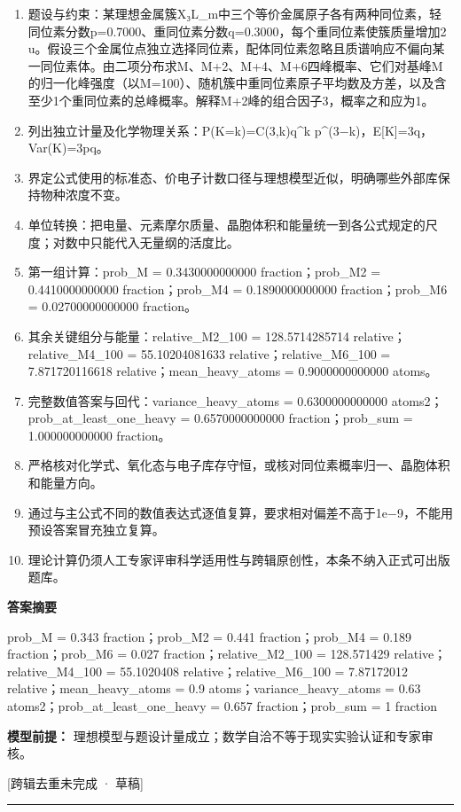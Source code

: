 \documentclass[UTF8,11pt,a4paper]{ctexart}
\begin{document}
\begin{enumerate}
\item 题设与约束：某理想金属簇X₃L\_m中三个等价金属原子各有两种同位素，轻同位素分数p=0.7000、重同位素分数q=0.3000，每个重同位素使簇质量增加2 u。假设三个金属位点独立选择同位素，配体同位素忽略且质谱响应不偏向某一同位素体。由二项分布求M、M+2、M+4、M+6四峰概率、它们对基峰M的归一化峰强度（以M=100）、随机簇中重同位素原子平均数及方差，以及含至少1个重同位素的总峰概率。解释M+2峰的组合因子3，概率之和应为1。
\item 列出独立计量及化学物理关系：P(K=k)=C(3,k)q\textasciicircum{}k p\textasciicircum{}(3−k)，E[K]=3q，Var(K)=3pq。
\item 界定公式使用的标准态、价电子计数口径与理想模型近似，明确哪些外部库保持物种浓度不变。
\item 单位转换：把电量、元素摩尔质量、晶胞体积和能量统一到各公式规定的尺度；对数中只能代入无量纲的活度比。
\item 第一组计算：prob\_M = 0.3430000000000 fraction；prob\_M2 = 0.4410000000000 fraction；prob\_M4 = 0.1890000000000 fraction；prob\_M6 = 0.02700000000000 fraction。
\item 其余关键组分与能量：relative\_M2\_100 = 128.5714285714 relative；relative\_M4\_100 = 55.10204081633 relative；relative\_M6\_100 = 7.871720116618 relative；mean\_heavy\_atoms = 0.9000000000000 atoms。
\item 完整数值答案与回代：variance\_heavy\_atoms = 0.6300000000000 atoms2；prob\_at\_least\_one\_heavy = 0.6570000000000 fraction；prob\_sum = 1.000000000000 fraction。
\item 严格核对化学式、氧化态与电子库存守恒，或核对同位素概率归一、晶胞体积和能量方向。
\item 通过与主公式不同的数值表达式逐值复算，要求相对偏差不高于1e−9，不能用预设答案冒充独立复算。
\item 理论计算仍须人工专家评审科学适用性与跨辑原创性，本条不纳入正式可出版题库。
\end{enumerate}
\noindent\textbf{答案摘要}\par
prob\_M = 0.343 fraction；prob\_M2 = 0.441 fraction；prob\_M4 = 0.189 fraction；prob\_M6 = 0.027 fraction；relative\_M2\_100 = 128.571429 relative；relative\_M4\_100 = 55.1020408 relative；relative\_M6\_100 = 7.87172012 relative；mean\_heavy\_atoms = 0.9 atoms；variance\_heavy\_atoms = 0.63 atoms2；prob\_at\_least\_one\_heavy = 0.657 fraction；prob\_sum = 1 fraction\par
\noindent\textbf{模型前提：}
理想模型与题设计量成立；数学自洽不等于现实实验认证和专家审核。\par
\noindent\textcolor{red!65!black}{[跨辑去重未完成 · 草稿]} \par
\medskip\hrule\medskip
\end{document}
